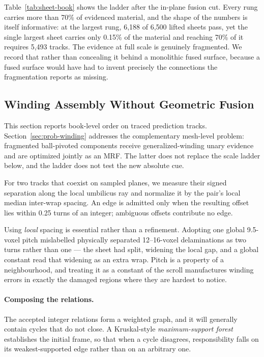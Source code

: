Table~\ref{tab:sheet-book} shows the ladder after the in-plane fusion cut. Every rung carries more than 70\% of evidenced material, and the shape of the numbers is itself informative: at the largest rung, 6,188 of 6,500 lifted sheets pass, yet the single largest sheet carries only 0.15\% of the material and reaching 70\% of it requires 5,493 tracks. The evidence at full scale is genuinely fragmented. We record that rather than concealing it behind a monolithic fused surface, because a fused surface would have had to invent precisely the connections the fragmentation reports as missing.

\subsection{Winding Assembly Without Geometric Fusion}
\label{sec:winding}


This section reports book-level order on traced prediction tracks. Section~\ref{sec:prob-winding} addresses the complementary mesh-level problem: fragmented ball-pivoted components receive generalized-winding unary evidence and are optimized jointly as an MRF. The latter does not replace the scale ladder below, and the ladder does not test the new absolute cue.

For two tracks that coexist on sampled planes, we measure their signed separation along the local umbilicus ray and normalize it by the pair's local median inter-wrap spacing. An edge is admitted only when the resulting offset lies within 0.25 turns of an integer; ambiguous offsets contribute no edge.

Using \emph{local} spacing is essential rather than a refinement. Adopting one global 9.5-voxel pitch mislabelled physically separated 12--16-voxel delaminations as two turns rather than one --- the sheet had split, widening the local gap, and a global constant read that widening as an extra wrap. Pitch is a property of a neighbourhood, and treating it as a constant of the scroll manufactures winding errors in exactly the damaged regions where they are hardest to notice.

\paragraph{Composing the relations.} The accepted integer relations form a weighted graph, and it will generally contain cycles that do not close. A Kruskal-style \emph{maximum-support forest} establishes the initial frame, so that when a cycle disagrees, responsibility falls on its weakest-supported edge rather than on an arbitrary one.


